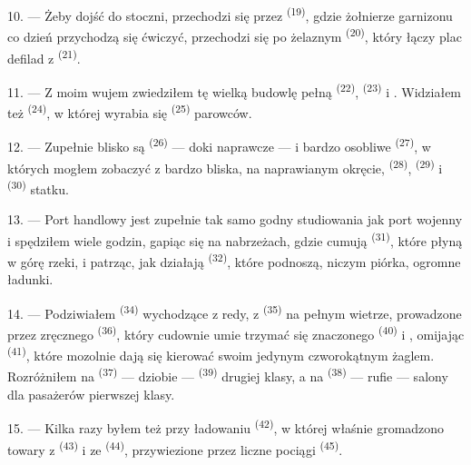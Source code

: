 10. --- Żeby dojść do stoczni, przechodzi się przez 
\textsuperscript{(19)}, gdzie żołnierze garnizonu co dzień przychodzą się ćwiczyć,
przechodzi się po żelaznym  \textsuperscript{(20)}, który łączy plac
defilad z  \textsuperscript{(21)}.

\VUsaut{3.0mm}
\VUsaut{3.0mm}

11. --- Z moim wujem zwiedziłem tę wielką budowlę pełną 
\textsuperscript{(22)},  \textsuperscript{(23)} i .
Widziałem też  \textsuperscript{(24)}, w której wyrabia się
 \textsuperscript{(25)} parowców.

12. --- Zupełnie blisko są  \textsuperscript{(26)} --- doki naprawcze --- i
bardzo osobliwe  \textsuperscript{(27)}, w których mogłem
zobaczyć z bardzo bliska, na naprawianym okręcie,  \textsuperscript{(28)},
 \textsuperscript{(29)} i  \textsuperscript{(30)} statku.

13. --- Port handlowy jest zupełnie tak samo godny studiowania jak port wojenny i
spędziłem wiele godzin, gapiąc się na nabrzeżach, gdzie cumują 
\textsuperscript{(31)}, które płyną w górę rzeki, i patrząc, jak działają  \textsuperscript{(32)}, które podnoszą, niczym piórka, ogromne ładunki.

\VUsaut{4.0mm}
\VUsaut{3.0mm}

14. --- Podziwiałem  \textsuperscript{(34)} wychodzące z redy, z
 \textsuperscript{(35)} na pełnym wietrze, prowadzone przez zręcznego
 \textsuperscript{(36)}, który cudownie umie trzymać się  znaczonego  \textsuperscript{(40)} i ,
omijając  \textsuperscript{(41)}, które mozolnie dają się kierować swoim
jedynym czworokątnym żaglem. Rozróżniłem na 
\textsuperscript{(37)} --- dziobie ---  \textsuperscript{(39)} drugiej
klasy, a na  \textsuperscript{(38)} --- rufie --- salony dla
pasażerów pierwszej klasy.

15. --- Kilka razy byłem też przy ładowaniu 
\textsuperscript{(42)}, w której właśnie gromadzono towary z 
\textsuperscript{(43)} i ze  \textsuperscript{(44)}, przywiezione
przez liczne pociągi  \textsuperscript{(45)}.

